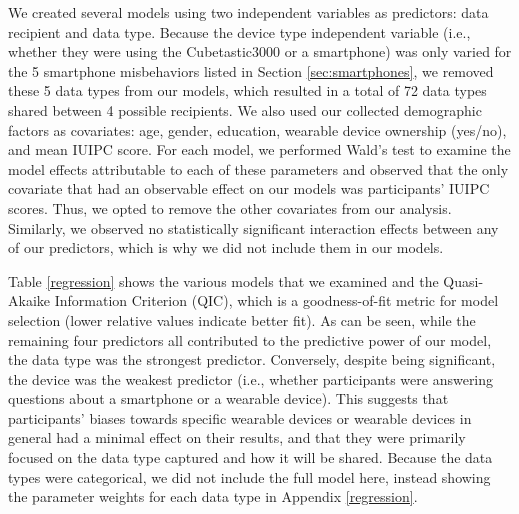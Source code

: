 We created several models using two independent variables as predictors: data recipient and data type. Because the device type independent variable (i.e., whether they were using the Cubetastic3000 or a smartphone) was only varied for the 5 smartphone misbehaviors listed in Section \ref{sec:smartphones}, we removed these 5 data types from our models, which resulted in a total of 72 data types shared between 4 possible recipients. We also used our collected demographic factors as covariates: age, gender, education, wearable device ownership (yes/no), and mean IUIPC score. For each model, we performed Wald's test to examine the model effects attributable to each of these parameters and observed that the only covariate that had an observable effect on our models was participants' IUIPC scores. Thus, we opted to remove the other covariates from our analysis. Similarly, we observed no statistically significant interaction effects between any of our predictors, which is why we did not include them in our models.

Table \ref{regression} shows the various models that we examined and the Quasi-Akaike Information Criterion (QIC), which is a goodness-of-fit metric for model selection (lower relative values indicate better fit). As can be seen, while the remaining four predictors all contributed to the predictive power of our model, the data type was the strongest predictor. Conversely, despite being significant, the device was the weakest predictor (i.e., whether participants were answering questions about a smartphone or a wearable device). This suggests that participants' biases towards specific wearable devices or wearable devices in general had a minimal effect on their results, and that they were primarily focused on the data type captured and how it will be shared. Because the data types were categorical, we did not include the full model here, instead showing the parameter weights for each data type in Appendix \ref{regression}.



